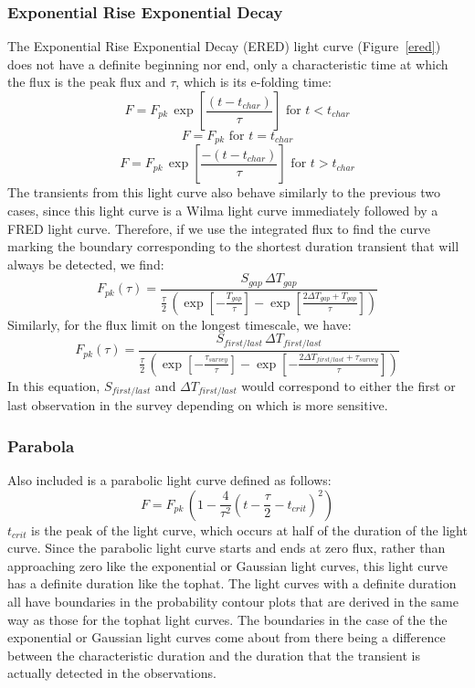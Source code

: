 \documentclass[12pt]{article}
\begin{document}
\subsubsection{Exponential Rise Exponential Decay}
The Exponential Rise Exponential Decay (ERED) light curve (Figure~\ref{ered}) does not have a definite beginning nor end, only a characteristic time at which the flux is the peak flux and $\tau$, which is its e-folding time:
\begin{equation}F=F_{pk}\,\exp\left[{\frac{(t-t_{char})}{\tau}}\right]\text{ for }t< t_{char}\end{equation}
\begin{equation}F=F_{pk}\text{ for }t=t_{char}\end{equation}
\begin{equation}F=F_{pk}\,\exp\left[{\frac{-(t-t_{char})}{\tau}}\right]\text{ for }t> t_{char}\end{equation}
The transients from this light curve also behave similarly to the previous two cases, since this light curve is a Wilma light curve immediately followed by a FRED light curve.  Therefore, if we use the integrated flux to find the curve marking the boundary corresponding to the shortest duration transient that will always be detected, we find:
\begin{equation}F_{pk}(\tau) = \frac{ S _{gap}\,\Delta T_{gap}}{\frac{\tau}{2}\,\left(\exp\left[-\frac{T_{gap}}{\tau}\right] - \exp\left[\frac{2\Delta T_{gap} + T_{gap}}{\tau}\right]\right)}\end{equation}
Similarly, for the flux limit on the longest timescale, we have:
\begin{equation}F_{pk}(\tau) = \frac{S_{first/last}\,\Delta T_{first/last}}{\frac{\tau}{2}\,\left(\exp\left[-\frac{\tau_{survey}}{\tau}\right] - \exp\left[-\frac{2\Delta T_{first/last} + \tau_{survey}}{\tau}\right]\right)}\end{equation}
In this equation, $S_{first/last}$ and $\Delta T_{first/last}$ would correspond to either the first or last observation in the survey depending on which is more sensitive. 

\subsubsection{Parabola}
Also included is a parabolic light curve defined as follows:
\begin{equation}F = F_{pk}\,\left(1 - \frac{4}{\tau^2}\left(t - \frac{\tau}{2} - t_{crit}\right)^2\right)\end{equation}
$t_{crit}$ is the peak of the light curve, which occurs at half of the duration of the light curve. Since the parabolic light curve starts and ends at zero flux, rather than approaching zero like the exponential or Gaussian light curves, this light curve has a definite duration like the tophat. The light curves with a definite duration all have boundaries in the probability contour plots that are derived in the same way as those for the tophat light curves. The boundaries in the case of the the exponential or Gaussian light curves come about from there being a difference between the characteristic duration and the duration that the transient is actually detected in the observations. 
\end{document}
